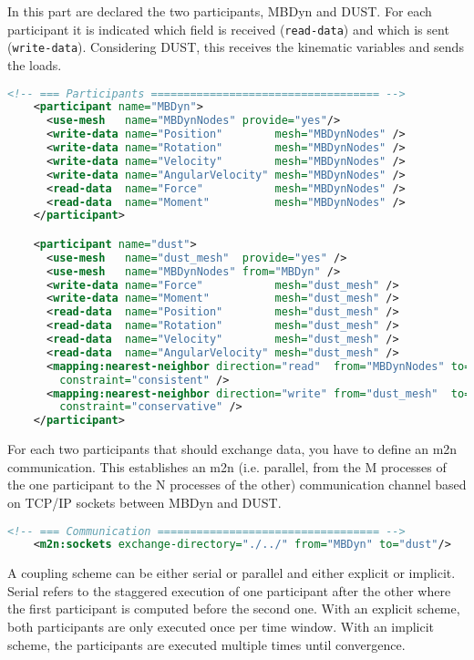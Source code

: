 In this part are declared the two participants, MBDyn and DUST. For each participant it is indicated which field is received (\texttt{read-data}) and which is sent (\texttt{write-data}). Considering DUST, this receives the kinematic variables and sends the loads. 
\begin{lstlisting}[language=XML]
    <!-- === Participants =================================== -->
    <participant name="MBDyn">
      <use-mesh   name="MBDynNodes" provide="yes"/>
      <write-data name="Position"        mesh="MBDynNodes" />
      <write-data name="Rotation"        mesh="MBDynNodes" />
      <write-data name="Velocity"        mesh="MBDynNodes" />
      <write-data name="AngularVelocity" mesh="MBDynNodes" />
      <read-data  name="Force"           mesh="MBDynNodes" />
      <read-data  name="Moment"          mesh="MBDynNodes" />
    </participant>

    <participant name="dust">
      <use-mesh   name="dust_mesh"  provide="yes" />
      <use-mesh   name="MBDynNodes" from="MBDyn" />
      <write-data name="Force"           mesh="dust_mesh" />
      <write-data name="Moment"          mesh="dust_mesh" />
      <read-data  name="Position"        mesh="dust_mesh" />
      <read-data  name="Rotation"        mesh="dust_mesh" />
      <read-data  name="Velocity"        mesh="dust_mesh" />
      <read-data  name="AngularVelocity" mesh="dust_mesh" />
      <mapping:nearest-neighbor direction="read"  from="MBDynNodes" to="dust_mesh"
        constraint="consistent" />
      <mapping:nearest-neighbor direction="write" from="dust_mesh"  to="MBDynNodes"
        constraint="conservative" />
    </participant>
\end{lstlisting}

For each two participants that should exchange data, you have to define an m2n communication. 
This establishes an m2n (i.e. parallel, from the M processes of the one participant to the N processes of the other) communication channel based on TCP/IP sockets between MBDyn and DUST.
\begin{lstlisting}[language=XML]
    <!-- === Communication ================================== -->
    <m2n:sockets exchange-directory="./../" from="MBDyn" to="dust"/>
\end{lstlisting}

A coupling scheme can be either serial or parallel and either explicit or implicit. Serial refers to the staggered execution of one participant after the other where the first participant is computed before the second one. With an explicit scheme, both participants are only executed once per time window. With an implicit scheme, the participants are executed multiple times until convergence.

